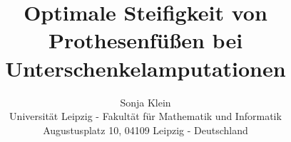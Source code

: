 \documentclass{SeminarV2}
\begin{document}
\title{Optimale Steifigkeit von Prothesenfüßen bei Unterschenkelamputationen}

\author{Sonja Klein
%
\vspace{.3cm}\\
%
Universität Leipzig - Fakultät für Mathematik und Informatik \\
Augustusplatz 10, 04109 Leipzig - Deutschland
}

\maketitle







\end{document}
